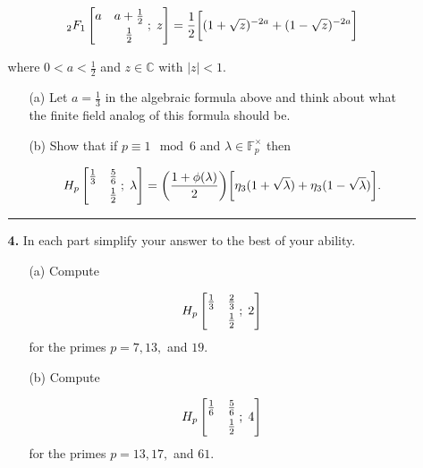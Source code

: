 \documentclass[12pt]{amsart}
\theoremstyle{definition}
\theoremstyle{remark}
\numberwithin{equation}{section}
\def \l {\lambda}
\def\C{\mathbb C}
\def \l {\lambda}
\def\C{\mathbb{C}}
\newcommand{\fp}
{\mathbb{F}_p}
\newcommand*\HYPERskip{&}
\newcommand*\pFq{
\begingroup
\catcode`\,\active
\def ,{\HYPERskip}%
\doHyper
}
\def\doHyper#1#2#3#4#5{%
\, _{#1}F_{#2}\left[\begin{matrix}#3 \smallskip \\  #4\end{matrix} \; ; \; #5\right]%
\endgroup
}
\begin{document}
\begin{itemize}
\begin{itemize}
$$\pFq{2}{1}{a & a+\frac{1}{2}}{&\frac{1}{2}}{z} = \frac{1}{2} \bigg[(1 + \sqrt{z})^{-2a} + (1 - \sqrt{z})^{-2a} \bigg]$$

\vspace{4mm}

where $0 < a < \frac{1}{2}$ and $z \in \C$ with $|z| < 1$.

\vspace{4mm}

\begin{itemize}
\item[(a)] Let $a = \frac{1}{3}$ in the algebraic formula above and think about what the finite field analog of this formula should be.

\vspace{4mm}

\item[(b)] Show that if $p \equiv 1 \mod 6$ and $\l \in \fp^{\times}$ then

$$H_{p}\left[\begin{matrix} \frac{1}{3} & \frac{5}{6} \smallskip \\   & \frac{1}{2} \end{matrix} \; ; \; \l \right] = \bigg(\frac{1 + \phi(\l)}{2} \bigg) \bigg[\eta_{3}(1 + \sqrt{\l}) + \eta_{3}(1 - \sqrt{\l}) \bigg].$$
\end{itemize}

\vspace{8mm}

\hrule{}

\vspace{4mm}

\item[\textbf{4.}] In each part simplify your answer to the best of your ability.

\vspace{4mm}

\begin{itemize}
\item[(a)] Compute 

$$H_{p}\left[\begin{matrix} \frac{1}{3} & \frac{2}{3} \smallskip \\   & \frac{1}{2} \end{matrix} \; ; \; 2 \right]$$ for the primes $p = 7, 13,$ and $19$.

\vspace{4mm}

\item[(b)] Compute 

$$H_{p}\left[\begin{matrix} \frac{1}{6} & \frac{5}{6} \smallskip \\   & \frac{1}{2} \end{matrix} \; ; \; 4 \right]$$ for the primes $p = 13, 17,$ and $61$.


\end{itemize}
\end{itemize}
\end{itemize}
\end{document}
